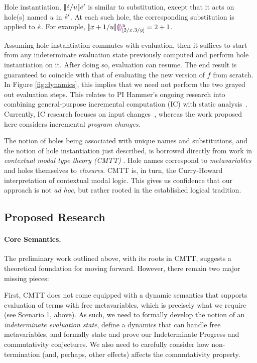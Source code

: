Hole instantiation, $[\!| \dot{e} / u |\!]\dot{e}'$ is similar to substitution, except that it acts on
 hole(s) named $u$ in $\dot{e}'$. At each such hole, the corresponding substitution is applied to $\dot{e}$. For example,
$[\!| x + 1 / u |\!]\textcolor{violet}{\llparenthesis}\textcolor{violet}{\rrparenthesis}{}^u_{[2/x, 3/y]} = 2 + 1$. 

Assuming hole instantiation commutes with evaluation, then it suffices to start from any indeterminate evaluation 
state previously computed and perform hole instantiation on it. After doing so, evaluation can resume. The end result is guaranteed to coincide with that of evaluating the new version of $f$ from scratch. In Figure \ref{fig:dynamics}, this implies that we need not perform the two grayed out evaluation steps. This relates to PI Hammer's
ongoing research into combining general-purpose incremental
computation (IC) with static analysis~\cite{OVV2016}. 
%
Currently, IC research focuses on input
changes~\citep{TypedAdapton2016, Fisher2016, Hammer2015, Chen2014,
Hammer2014, Chen2011, Hammer2011, Hammer2009, Hammer2008}, whereas the
work proposed here considers incremental \emph{program changes}.

The notion of holes being associated with unique names and substitutions, and the notion of hole instantiation just described, is borrowed directly from work in \emph{contextual modal type theory (CMTT)} \cite{Nanevski2008}. Hole names correspond to \emph{metavariables} and holes themselves to \emph{closures}. CMTT is, in turn, the Curry-Howard interpretation of contextual modal logic. This gives us confidence that our approach is not \emph{ad hoc}, but rather rooted in the established logical tradition.

\subsection{Proposed Research}

\paragraph{Core Semantics.} The preliminary work outlined above, with its roots in CMTT, suggests a theoretical foundation for moving forward. However, there remain two major missing pieces:

First, CMTT does not come equipped with a dynamic semantics that supports evaluation of terms with free metavariables, which is precisely what we require (see Scenario 1, above). As such, we need to formally develop the notion of an \emph{indeterminate evaluation state}, define a dynamics that can handle free metavariables, and formally state and prove our Indeterminate Progress and commutativity conjectures. We also need to carefully consider how non-termination (and, perhaps, other effects) affects the commutativity property.

